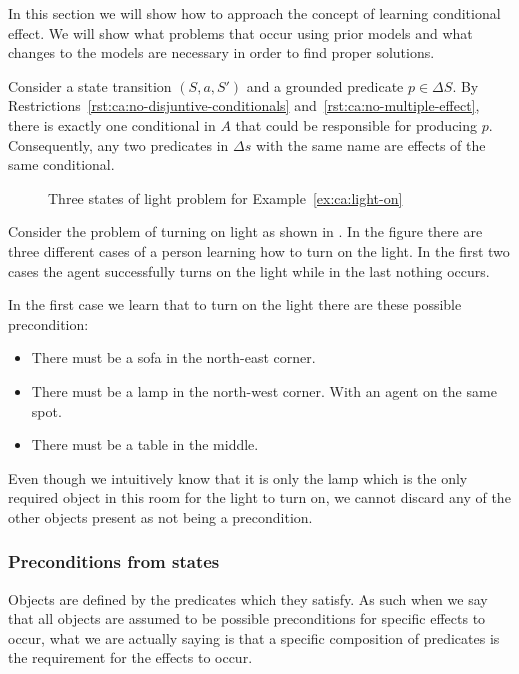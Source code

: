 \documentclass[\master/Master.tex]{subfiles}
\begin{document}
In this section we will show how to approach the concept of learning conditional effect. We will show what problems that occur using prior models and what changes to the models are necessary in order to find proper solutions.

\begin{proposition}\label{prop:ca:singleConditional}
    Consider a state transition $\left(S, a, S'\right)$ and a grounded predicate $p \in \Delta S$. By Restrictions~\ref{rst:ca:no-disjuntive-conditionals} and~\ref{rst:ca:no-multiple-effect}, there is exactly one conditional in $A$ that could be responsible for producing $p$. Consequently, any two predicates in $\Delta s$ with the same name are effects of the same conditional.
\end{proposition}

\begin{figure}
	\caption{\label{fig:ca:house-example}Three states of light problem for Example~\ref{ex:ca:light-on}}
\end{figure}

\begin{example}\label{ex:ca:light-on}
Consider the problem of turning on light as shown in .
In the figure there are three different cases of a person learning how to turn on the
light. In the first two cases the agent successfully turns on the light while in the last nothing occurs.

In the first case we learn that to turn on the light there are these possible precondition:
\begin{itemize}
	\item There must be a sofa in the north-east corner.
	\item There must be a lamp in the north-west corner. With an agent on the same spot.
	\item There must be a table in the middle.
\end{itemize}
Even though we intuitively know that it is only the lamp which is the only required object in this room for the light to turn on, we cannot discard any of the other objects present as not being a precondition.
\end{example}

\subsubsection{Preconditions from states}
Objects are defined by the predicates which they satisfy. As such when we say that all objects are assumed to be possible preconditions for specific effects to occur, what we are actually saying is that a specific composition of predicates is the requirement for the effects to occur.
\end{document}
